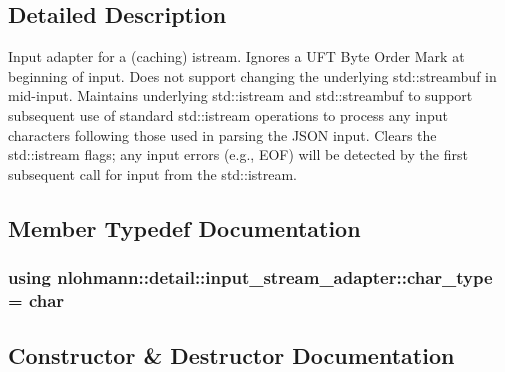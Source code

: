 \subsection{Detailed Description}
Input adapter for a (caching) istream. Ignores a U\+FT Byte Order Mark at beginning of input. Does not support changing the underlying std\+::streambuf in mid-\/input. Maintains underlying std\+::istream and std\+::streambuf to support subsequent use of standard std\+::istream operations to process any input characters following those used in parsing the J\+S\+ON input. Clears the std\+::istream flags; any input errors (e.\+g., E\+OF) will be detected by the first subsequent call for input from the std\+::istream. 

\subsection{Member Typedef Documentation}
\subsubsection[{\texorpdfstring{char\+\_\+type}{char_type}}]{\setlength{\rightskip}{0pt plus 5cm}using {\bf nlohmann\+::detail\+::input\+\_\+stream\+\_\+adapter\+::char\+\_\+type} =  char}\hypertarget{classnlohmann_1_1detail_1_1input__stream__adapter_a72f0713587f6bb3f3fbaae7d34c0ca39}{}\label{classnlohmann_1_1detail_1_1input__stream__adapter_a72f0713587f6bb3f3fbaae7d34c0ca39}


\subsection{Constructor \& Destructor Documentation}
